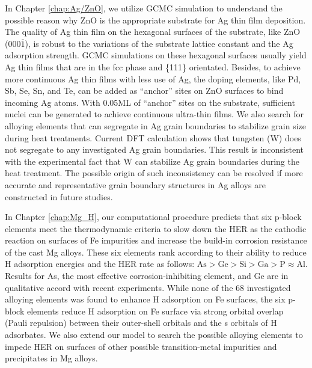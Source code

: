 In Chapter \ref{chap:Ag/ZnO}, we utilize \acf{GCMC} simulation to understand the possible reason why ZnO is the appropriate substrate for Ag thin film deposition. The quality of Ag thin film on the hexagonal surfaces of the substrate, like ZnO (000$\overline{1}$), is robust to the variations of the substrate lattice constant and the Ag adsorption strength. \ac{GCMC} simulations on these hexagonal surfaces usually yield Ag thin films that are in the fcc phase and \{111\} orientated. Besides, to achieve more continuous Ag thin films with less use of Ag, the doping elements, like Pd, Sb, Se, Sn, and Te, can be added as ``anchor'' sites on ZnO surfaces to bind incoming Ag atoms. With 0.05\ac{ML} of ``anchor'' sites on the substrate, sufficient nuclei can be generated to achieve continuous ultra-thin films. We also search for alloying elements that can segregate in Ag grain boundaries to stabilize grain size during heat treatments. Current \ac{DFT} calculation shows that tungsten (W) does not segregate to any investigated Ag grain boundaries. This result is inconsistent with the experimental fact that W can stabilize Ag grain boundaries during the heat treatment. The possible origin of such inconsistency can be resolved if more accurate and representative grain boundary structures in Ag alloys are constructed in future studies.

In Chapter \ref{chap:Mg_H}, our computational procedure predicts that six p-block elements meet the thermodynamic criteria to slow down the \acf{HER} as the cathodic reaction on surfaces of Fe impurities and increase the build-in corrosion resistance of the cast Mg alloys. These six elements rank according to their ability to reduce H adsorption energies and the \ac{HER} rate as follows: $\text{As} > \text{Ge} > \text{Si} > \text{Ga} > \text{P} \approx \text{Al}$. Results for As, the most effective corrosion-inhibiting element, and Ge are in qualitative accord with recent experiments. While none of the 68 investigated alloying elements was found to enhance H adsorption on Fe surfaces, the six p-block elements reduce H adsorption on Fe surface via strong orbital overlap (Pauli repulsion) between their outer-shell orbitals and the s orbitals of H adsorbates. We also extend our model to search the possible alloying elements to impede \ac{HER} on surfaces of other possible transition-metal impurities and precipitates in Mg alloys. 

